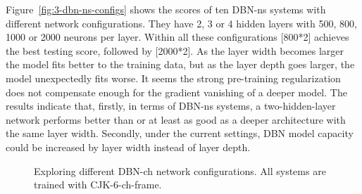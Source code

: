 Figure~\ref{fig:3-dbn-ns-configs} shows the scores of ten DBN-ns systems with different network configurations. They have 2, 3 or 4 hidden layers with 500, 800, 1000 or 2000 neurons per layer. Within all these configurations [800*2] achieves the best testing score, followed by [2000*2]. As the layer width becomes larger the model fits better to the training data, but as the layer depth goes larger, the model unexpectedly fits worse. It seems the strong pre-training regularization does not compensate enough for the gradient vanishing of a deeper model. The results indicate that, firstly, in terms of DBN-ns systems, a two-hidden-layer network performs better than or at least as good as a deeper architecture with the same layer width. Secondly, under the current settings, DBN model capacity could be increased by layer width instead of layer depth.

\begin{figure}[htb]
	\centering
	\caption{Exploring different DBN-ch network configurations. All systems are trained with CJK-6-ch-frame.}
	\label{fig:3-dbn-ch-configs}
\end{figure}

